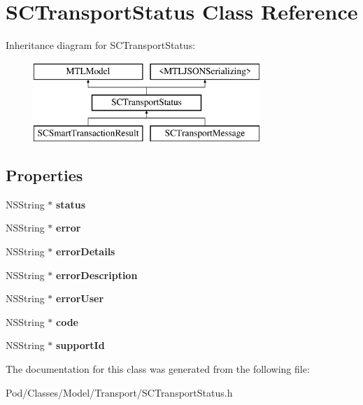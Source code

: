 \hypertarget{interface_s_c_transport_status}{}\section{S\+C\+Transport\+Status Class Reference}
\label{interface_s_c_transport_status}
Inheritance diagram for S\+C\+Transport\+Status\+:\begin{figure}[H]
\begin{center}
\leavevmode
\includegraphics[height=3.000000cm]{interface_s_c_transport_status}
\end{center}
\end{figure}
\subsection*{Properties}
\begin{DoxyCompactItemize}
\item 
N\+S\+String $\ast$ {\bfseries status}\hypertarget{interface_s_c_transport_status_aee48de1dffc85a41257e702bd236f312}{}\label{interface_s_c_transport_status_aee48de1dffc85a41257e702bd236f312}

\item 
N\+S\+String $\ast$ {\bfseries error}\hypertarget{interface_s_c_transport_status_a0ebc849359431ecfb152fa6331c27afb}{}\label{interface_s_c_transport_status_a0ebc849359431ecfb152fa6331c27afb}

\item 
N\+S\+String $\ast$ {\bfseries error\+Details}\hypertarget{interface_s_c_transport_status_a2e0db4b646776eb4bc1ff3db2db4dcda}{}\label{interface_s_c_transport_status_a2e0db4b646776eb4bc1ff3db2db4dcda}

\item 
N\+S\+String $\ast$ {\bfseries error\+Description}\hypertarget{interface_s_c_transport_status_a71c302571f97e26dad1a0396d067c8c1}{}\label{interface_s_c_transport_status_a71c302571f97e26dad1a0396d067c8c1}

\item 
N\+S\+String $\ast$ {\bfseries error\+User}\hypertarget{interface_s_c_transport_status_a8aeb62db4a31b21c12c799d71476fa0a}{}\label{interface_s_c_transport_status_a8aeb62db4a31b21c12c799d71476fa0a}

\item 
N\+S\+String $\ast$ {\bfseries code}\hypertarget{interface_s_c_transport_status_ae4cac5fbda43d5af923ae67973ef6024}{}\label{interface_s_c_transport_status_ae4cac5fbda43d5af923ae67973ef6024}

\item 
N\+S\+String $\ast$ {\bfseries support\+Id}\hypertarget{interface_s_c_transport_status_ad8e4ac31e7548cbafb85f3cb1e10eb76}{}\label{interface_s_c_transport_status_ad8e4ac31e7548cbafb85f3cb1e10eb76}

\end{DoxyCompactItemize}


The documentation for this class was generated from the following file\+:\begin{DoxyCompactItemize}
\item 
Pod/\+Classes/\+Model/\+Transport/S\+C\+Transport\+Status.\+h\end{DoxyCompactItemize}
